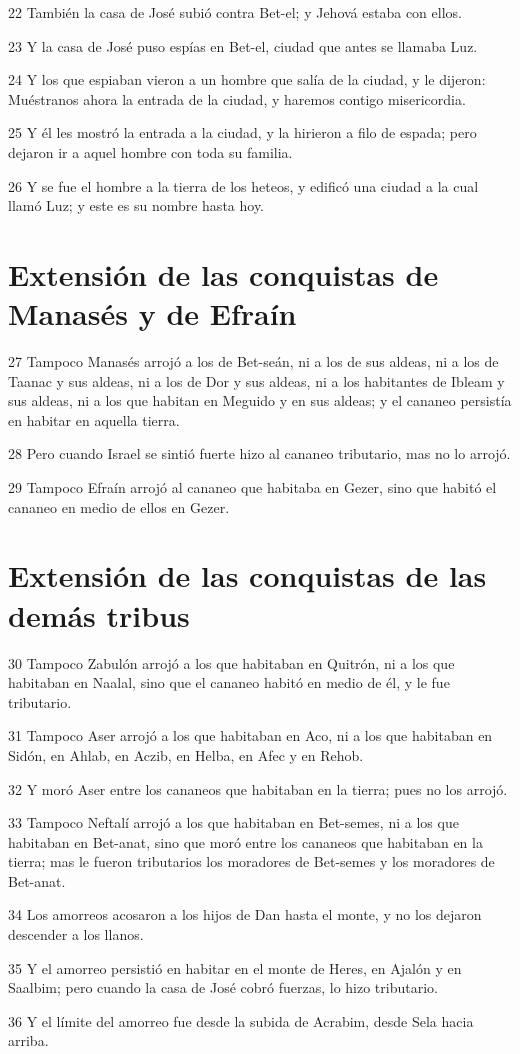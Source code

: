 \par 22 También la casa de José subió contra Bet-el; y Jehová estaba con ellos.
\par 23 Y la casa de José puso espías en Bet-el, ciudad que antes se llamaba Luz.
\par 24 Y los que espiaban vieron a un hombre que salía de la ciudad, y le dijeron: Muéstranos ahora la entrada de la ciudad, y haremos contigo misericordia.
\par 25 Y él les mostró la entrada a la ciudad, y la hirieron a filo de espada; pero dejaron ir a aquel hombre con toda su familia.
\par 26 Y se fue el hombre a la tierra de los heteos, y edificó una ciudad a la cual llamó Luz; y este es su nombre hasta hoy.

\section*{Extensión de las conquistas de Manasés y de Efraín}

\par 27 Tampoco Manasés arrojó a los de Bet-seán, ni a los de sus aldeas, ni a los de Taanac y sus aldeas, ni a los de Dor y sus aldeas, ni a los habitantes de Ibleam y sus aldeas, ni a los que habitan en Meguido y en sus aldeas; y el cananeo persistía en habitar en aquella tierra.
\par 28 Pero cuando Israel se sintió fuerte hizo al cananeo tributario, mas no lo arrojó. 
\par 29 Tampoco Efraín arrojó al cananeo que habitaba en Gezer, sino que habitó el cananeo en medio de ellos en Gezer. 

\section*{Extensión de las conquistas de las demás tribus}

\par 30 Tampoco Zabulón arrojó a los que habitaban en Quitrón, ni a los que habitaban en Naalal, sino que el cananeo habitó en medio de él, y le fue tributario.
\par 31 Tampoco Aser arrojó a los que habitaban en Aco, ni a los que habitaban en Sidón, en Ahlab, en Aczib, en Helba, en Afec y en Rehob.
\par 32 Y moró Aser entre los cananeos que habitaban en la tierra; pues no los arrojó.
\par 33 Tampoco Neftalí arrojó a los que habitaban en Bet-semes, ni a los que habitaban en Bet-anat, sino que moró entre los cananeos que habitaban en la tierra; mas le fueron tributarios los moradores de Bet-semes y los moradores de Bet-anat. 
\par 34 Los amorreos acosaron a los hijos de Dan hasta el monte, y no los dejaron descender a los llanos.
\par 35 Y el amorreo persistió en habitar en el monte de Heres, en Ajalón y en Saalbim; pero cuando la casa de José cobró fuerzas, lo hizo tributario.
\par 36 Y el límite del amorreo fue desde la subida de Acrabim, desde Sela hacia arriba.


